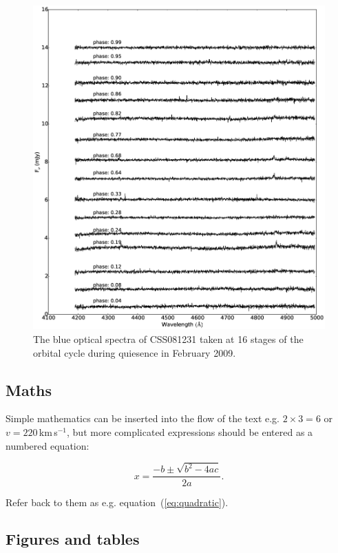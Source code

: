 \documentclass[a4paper,fleqn,usenatbib]{mnras}
\begin{document}
\begin{figure}
\centering
\includegraphics[width=\textwidth]{images/blue_spectra.eps}
\caption[Caption for spectra]{The blue optical spectra of CSS081231 taken at 16 stages of the orbital cycle during quiesence in February 2009.  }
\label{fig:spectra-quiescent-blue}
\end{figure}

\subsection{Maths}
\label{sec:maths} %

Simple mathematics can be inserted into the flow of the text e.g. $2\times3=6$
or $v=220$\,km\,s$^{-1}$, but more complicated expressions should be entered
as a numbered equation:

\begin{equation}
    x=\frac{-b\pm\sqrt{b^2-4ac}}{2a}.
	\label{eq:quadratic}
\end{equation}

Refer back to them as e.g. equation~(\ref{eq:quadratic}).

\subsection{Figures and tables}
\end{document}
